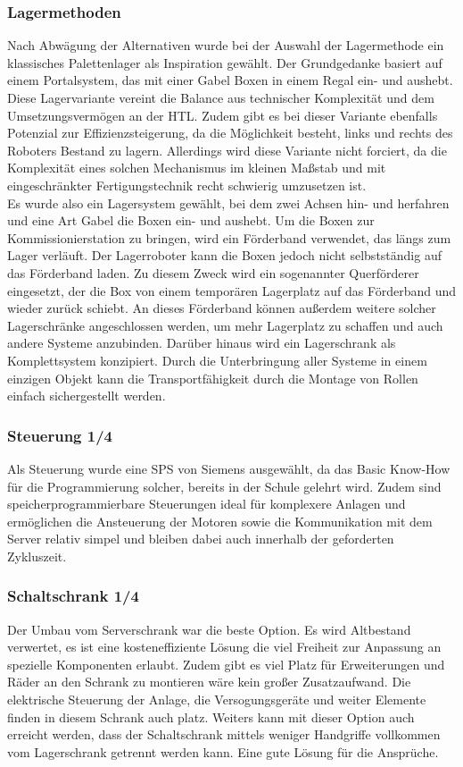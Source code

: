 \subsubsection{Lagermethoden }
Nach Abwägung der Alternativen wurde bei der Auswahl der Lagermethode ein klassisches Palettenlager als Inspiration gewählt. Der Grundgedanke basiert auf einem Portalsystem, das mit einer Gabel Boxen in einem Regal ein- und aushebt. Diese Lagervariante vereint die Balance aus technischer Komplexität und dem Umsetzungsvermögen an der HTL. Zudem gibt es bei dieser Variante ebenfalls Potenzial zur Effizienzsteigerung, da die Möglichkeit besteht, links und rechts des Roboters Bestand zu lagern. Allerdings wird diese Variante nicht forciert, da die Komplexität eines solchen Mechanismus im kleinen Maßstab und mit eingeschränkter Fertigungstechnik recht schwierig umzusetzen ist.
\\
Es wurde also ein Lagersystem gewählt, bei dem zwei Achsen hin- und herfahren und eine Art Gabel die Boxen ein- und aushebt. Um die Boxen zur Kommissionierstation zu bringen, wird ein Förderband verwendet, das längs zum Lager verläuft. Der Lagerroboter kann die Boxen jedoch nicht selbstständig auf das Förderband laden. Zu diesem Zweck wird ein sogenannter Querförderer eingesetzt, der die Box von einem temporären Lagerplatz auf das Förderband und wieder zurück schiebt. An dieses Förderband können außerdem weitere solcher Lagerschränke angeschlossen werden, um mehr Lagerplatz zu schaffen und auch andere Systeme anzubinden. Darüber hinaus wird ein Lagerschrank als Komplettsystem konzipiert. Durch die Unterbringung aller Systeme in einem einzigen Objekt kann die Transportfähigkeit durch die Montage von Rollen einfach sichergestellt werden.

\subsubsection{Steuerung 1/4}
Als Steuerung wurde eine SPS von Siemens ausgewählt, da das Basic Know-How für die Programmierung solcher, bereits in der Schule gelehrt wird. Zudem sind speicherprogrammierbare Steuerungen ideal für komplexere Anlagen und ermöglichen die Ansteuerung der Motoren sowie die Kommunikation mit dem Server relativ simpel und bleiben dabei auch innerhalb der geforderten Zykluszeit. 

\subsubsection{Schaltschrank 1/4}
Der Umbau vom Serverschrank war die beste Option. Es wird Altbestand verwertet, es ist eine kosteneffiziente Lösung die viel Freiheit zur Anpassung an spezielle Komponenten erlaubt. Zudem gibt es viel Platz für Erweiterungen und Räder an den Schrank zu montieren wäre kein großer Zusatzaufwand. Die elektrische Steuerung der Anlage, die Versogungsgeräte und weiter Elemente finden in diesem Schrank auch platz. Weiters kann mit dieser Option auch erreicht werden, dass der Schaltschrank mittels weniger Handgriffe vollkommen vom Lagerschrank getrennt werden kann.
Eine gute Lösung für die Ansprüche.
